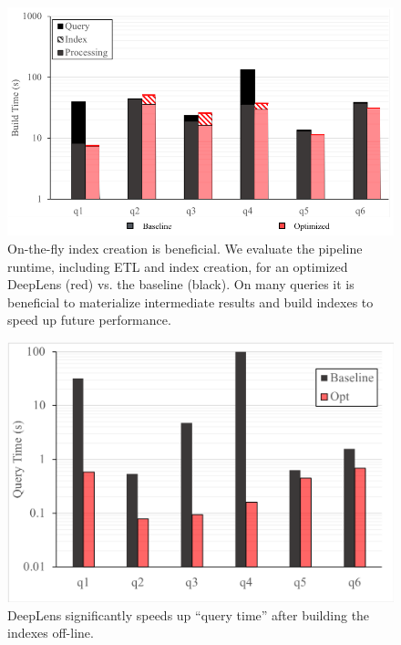 \begin{figure}[t]
\centering
 \includegraphics[width=\columnwidth]{figures/indexing1.png}
 \caption{On-the-fly index creation is beneficial. We evaluate the pipeline runtime, including ETL and index creation, for an optimized \textsf{DeepLens} (red) vs. the baseline (black). On many queries it is beneficial to materialize intermediate results and build indexes to speed up future performance.  \label{index} }
\end{figure}

\begin{figure}[t]
\centering
 \includegraphics[width=\columnwidth]{figures/query.png}
 \caption{\textsf{DeepLens} significantly speeds up ``query time'' after building the indexes off-line.  \label{query} }
\end{figure}

